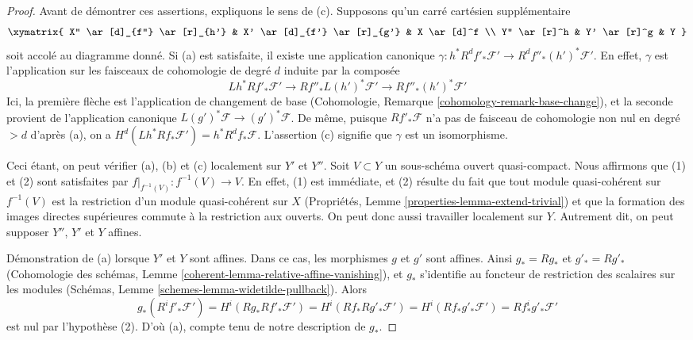 \begin{proof}
Avant de démontrer ces assertions, expliquons le sens de (c). Supposons
qu'un carré cartésien supplémentaire
$$
\xymatrix{
X'' \ar[d]_{f''} \ar[r]_{h'} &
X' \ar[d]_{f'} \ar[r]_{g'} &
X \ar[d]^f \\
Y'' \ar[r]^h &
Y' \ar[r]^g &
Y
}
$$
soit accolé au diagramme donné. Si (a) est satisfaite, il existe une application
canonique $\gamma : h^*R^df'_*\mathcal{F}' \to R^df''_*(h')^*\mathcal{F}'$.
En effet, $\gamma$ est l'application sur les faisceaux de cohomologie de degré $d$
induite par la composée
$$
Lh^*Rf'_*\mathcal{F}' \longrightarrow
Rf''_*L(h')^*\mathcal{F}' \longrightarrow Rf''_*(h')^*\mathcal{F}'
$$
Ici, la première flèche est l'application de changement de base
(Cohomologie, Remarque \ref{cohomology-remark-base-change}), et
la seconde provient de l'application canonique
$L(g')^*\mathcal{F} \to (g')^*\mathcal{F}$.
De même, puisque $Rf'_*\mathcal{F}$ n'a pas de faisceau de cohomologie non nul en
degré $> d$ d'après (a), on a
$H^d(Lh^*Rf_*\mathcal{F}') = h^*R^df_*\mathcal{F}$.
L'assertion (c) signifie que $\gamma$ est un isomorphisme.

\medskip\noindent
Ceci étant, on peut vérifier (a), (b) et (c) localement sur $Y'$ et $Y''$.
Soit $V \subset Y$ un sous-schéma ouvert quasi-compact. Nous
affirmons que (1) et (2) sont satisfaites par $f|_{f^{-1}(V)} : f^{-1}(V) \to V$.
En effet, (1) est immédiate, et (2) résulte du fait que tout module quasi-cohérent
sur $f^{-1}(V)$ est la restriction d'un module quasi-cohérent
sur $X$ (Propriétés, Lemme \ref{properties-lemma-extend-trivial}) et que la formation
des images directes supérieures commute à la restriction aux ouverts.
On peut donc aussi travailler localement sur $Y$. Autrement dit, on peut
supposer $Y''$, $Y'$ et $Y$ affines.

\medskip\noindent
Démonstration de (a) lorsque $Y'$ et $Y$ sont affines. Dans ce cas, les morphismes
$g$ et $g'$ sont affines. Ainsi $g_* = Rg_*$ et $g'_* = Rg'_*$
(Cohomologie des schémas, Lemme \ref{coherent-lemma-relative-affine-vanishing}),
et $g_*$ s'identifie au foncteur de restriction des scalaires sur les modules
(Schémas, Lemme \ref{schemes-lemma-widetilde-pullback}).
Alors
$$
g_*(R^if'_*\mathcal{F}') = H^i(Rg_*Rf'_*\mathcal{F}') =
H^i(Rf_*Rg'_*\mathcal{F}') =
H^i(Rf_*g'_*\mathcal{F}') =
Rf^i_*g'_*\mathcal{F}'
$$
est nul par l'hypothèse (2). D'où (a), compte tenu de notre description de $g_*$.


\end{proof}
